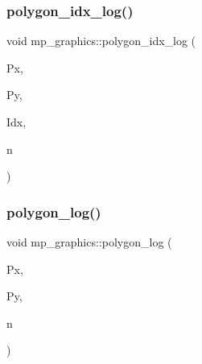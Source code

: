 \mbox{\label{classmp__graphics_aef990b1a5e84f4781ff613ce48fafe83}} 
\subsubsection{\texorpdfstring{polygon\+\_\+idx\+\_\+log()}{polygon\_idx\_log()}}
{\footnotesize\ttfamily void mp\+\_\+graphics\+::polygon\+\_\+idx\+\_\+log (\begin{DoxyParamCaption}\item[{\mbox{\hyperlink{galois_8h_a09fddde158a3a20bd2dcadb609de11dc}{I\+NT}} $\ast$}]{Px,  }\item[{\mbox{\hyperlink{galois_8h_a09fddde158a3a20bd2dcadb609de11dc}{I\+NT}} $\ast$}]{Py,  }\item[{\mbox{\hyperlink{galois_8h_a09fddde158a3a20bd2dcadb609de11dc}{I\+NT}} $\ast$}]{Idx,  }\item[{\mbox{\hyperlink{galois_8h_a09fddde158a3a20bd2dcadb609de11dc}{I\+NT}}}]{n }\end{DoxyParamCaption})}

\mbox{\label{classmp__graphics_ac7364cb768f58b2559a96b621d460b22}} 
\subsubsection{\texorpdfstring{polygon\+\_\+log()}{polygon\_log()}}
{\footnotesize\ttfamily void mp\+\_\+graphics\+::polygon\+\_\+log (\begin{DoxyParamCaption}\item[{\mbox{\hyperlink{galois_8h_a09fddde158a3a20bd2dcadb609de11dc}{I\+NT}} $\ast$}]{Px,  }\item[{\mbox{\hyperlink{galois_8h_a09fddde158a3a20bd2dcadb609de11dc}{I\+NT}} $\ast$}]{Py,  }\item[{\mbox{\hyperlink{galois_8h_a09fddde158a3a20bd2dcadb609de11dc}{I\+NT}}}]{n }\end{DoxyParamCaption})}

\mbox{\label{classmp__graphics_ac67f20507b7b4f592e9ed90aaa1f472a}} 

